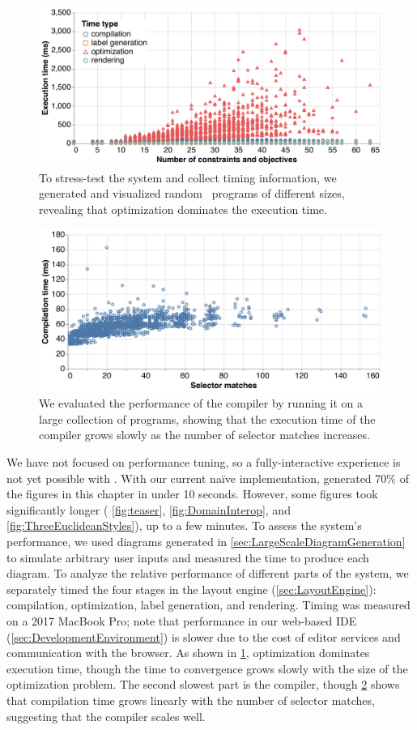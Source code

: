 \begin{figure}
  \centering
  \includegraphics[width=.7\columnwidth]{assets/penrose/optimization-graph.pdf}
  \caption{To stress-test the system and collect timing information, we generated and visualized random \Substance\ programs of different sizes, revealing that optimization dominates the execution time.
    \label{fig:optimization-performance}
  }
\end{figure}

\begin{figure}
  \centering
  \includegraphics[width=.7\columnwidth]{assets/penrose/compilation-graph.pdf}
  \caption{We evaluated the performance of the \Penrose{} compiler by running it on a large collection of programs, showing that the execution time of the compiler grows slowly as the number of selector matches increases.
    \label{fig:compilation-performance}
  }
\end{figure}

We have not focused on performance tuning, so a fully-interactive experience is not yet possible with \Penrose{}. With our current na\"ive implementation, \Penrose{} generated 70\% of the figures in this chapter in under 10 seconds. However, some figures took significantly longer (\eg{} \cref{fig:teaser}, \cref{fig:DomainInterop}, and \cref{fig:ThreeEuclideanStyles}), up to a few minutes. To assess the system's performance, we used diagrams generated in \cref{sec:LargeScaleDiagramGeneration} to simulate arbitrary user inputs and measured the time to produce each diagram. To analyze the relative performance of different parts of the system, we separately timed the four stages in the layout engine (\cref{sec:LayoutEngine}): compilation, optimization, label generation, and rendering.  Timing was measured on a 2017 MacBook Pro; note that performance in our web-based IDE (\cref{sec:DevelopmentEnvironment}) is slower due to the cost of editor services and communication with the browser.  As shown in \cref{fig:optimization-performance}, optimization dominates execution time, though the time to convergence grows slowly with the size of the optimization problem. The second slowest part is the compiler, though \cref{fig:compilation-performance} shows that compilation time grows linearly with the number of selector matches, suggesting that the compiler scales well.

